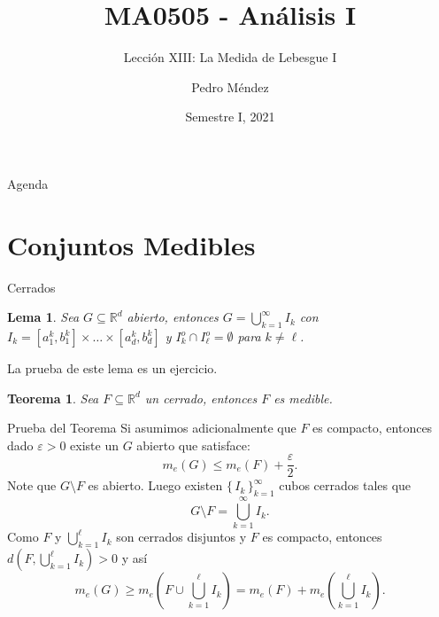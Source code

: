 \documentclass[utf8]{beamer}
\title[MA0505]{MA0505 - An\'alisis I}
\subtitle{Lecci\'on XIII: La Medida de Lebesgue I}
\author{Pedro M\'endez\inst{1}}
\institute[Universidad de Costa Rica] %
{
  \inst{1}%
  Departmento de Matem\'atica Pura y Ciencias Actuariales\\
  Universidad de Costa Rica
  }
\date[I-2021] {Semestre I, 2021}
\theoremstyle{plain}
\newtheorem{Th}{Teorema}               %
\newtheorem{Lem}{Lema}                 %
\theoremstyle{definition}
\theoremstyle{remark}
\numberwithin{equation}{section}
\newcommand{\eps}{\varepsilon}          %
\newcommand{\bR}{\mathbb{R}}    %
\newcommand{\bonj}[1]{\left\lbrack#1\right\rbrack}
\newcommand{\set}[1]{\{\,#1\,\}}    %
\newcommand{\x}{\times}
\renewcommand{\geq}{\geqslant}          %
\renewcommand{\l}{\ell}                   %
\renewcommand{\leq}{\leqslant}          %
\newcommand{\less}{\setminus}           %
\newcommand{\suck}{_{k=1}^\infty} %
\renewcommand{\.}{\Cdot}                %
\begin{document}
\begin{frame}
  \titlepage
\end{frame}

\begin{frame}{Agenda}
  \tableofcontents
\end{frame}





\section{Conjuntos Medibles}

\begin{frame}{Cerrados}
  \begin{Lem}\label{ej:parcial1I2018Ej7}
    Sea $G\subseteq\bR^d$ abierto, entonces $G=\bigcup_{k=1}^\infty I_k$ con $I_k=\bonj{a_1^k,b_1^k}\x\dots\x\bonj{a_d^k,b_d^k}$ y $I_k^o\cap I_\ell^o=\emptyset$ para $k\neq\ell$.
  \end{Lem}
  La prueba de este lema es un \alert{ejercicio}.
  \begin{Th}\label{th:closedMeasurable}
    Sea $F\subseteq\bR^d$ un cerrado, entonces $F$ es medible.
  \end{Th}
\end{frame}

\begin{frame}{Prueba del Teorema}
  Si asumimos adicionalmente que $F$ es compacto, entonces dado $\eps>0$ existe un $G$ abierto que satisface:
  $$m_e(G)\leq m_e(F)+\frac{\eps}{2}.$$
  Note que $G\less F$ es abierto. Luego existen $\set{I_k}\suck$ cubos cerrados tales que 
  $$G\less F=\bigcup\suck I_k.$$
  Como $F$ y $\bigcup_{k=1}^\l I_k$ son cerrados disjuntos y $F$ es compacto, entonces $d\left(F,\bigcup_{k=1}^\l I_k\right)>0$ y así
  $$m_e(G)\geq m_e\left(F\cup\bigcup_{k=1}^\l I_k\right)=m_e\left(F\right)+m_e\left(\bigcup_{k=1}^\l I_k\right).$$
\end{frame}
\end{document}
